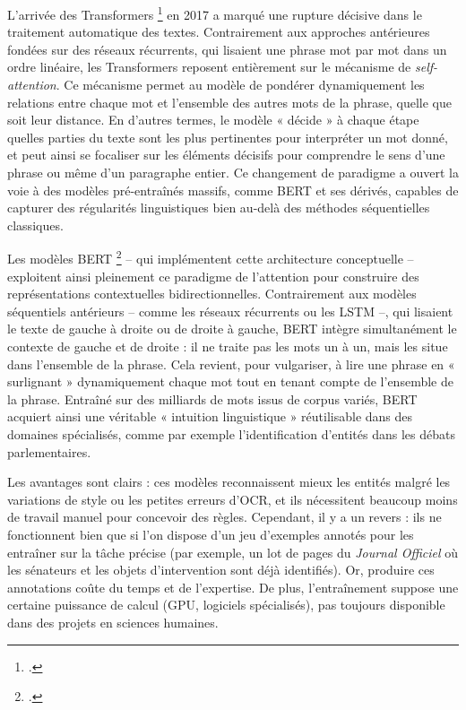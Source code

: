 L’arrivée des Transformers \footcite[][]{vaswani} en 2017 a marqué une rupture décisive dans le traitement automatique des textes. Contrairement aux approches antérieures fondées sur des réseaux récurrents, qui lisaient une phrase mot par mot dans un ordre linéaire, les Transformers reposent entièrement sur le mécanisme de \emph{self-attention}. Ce mécanisme permet au modèle de pondérer dynamiquement les relations entre chaque mot et l’ensemble des autres mots de la phrase, quelle que soit leur distance. En d’autres termes, le modèle « décide » à chaque étape quelles parties du texte sont les plus pertinentes pour interpréter un mot donné, et peut ainsi se focaliser sur les éléments décisifs pour comprendre le sens d’une phrase ou même d’un paragraphe entier. Ce changement de paradigme a ouvert la voie à des modèles pré-entraînés massifs, comme BERT et ses dérivés, capables de capturer des régularités linguistiques bien au-delà des méthodes séquentielles classiques.

Les modèles BERT \footcite[][]{devlin} -- qui implémentent cette architecture conceptuelle -- exploitent ainsi pleinement ce paradigme de l'attention pour construire des représentations contextuelles bidirectionnelles. Contrairement aux modèles séquentiels antérieurs -- comme les réseaux récurrents ou les LSTM --, qui lisaient le texte de gauche à droite ou de droite à gauche, BERT intègre simultanément le contexte de gauche et de droite : il ne traite pas les mots un à un, mais les situe dans l’ensemble de la phrase. Cela revient, pour vulgariser, à lire une phrase en « surlignant » dynamiquement chaque mot tout en tenant compte de l’ensemble de la phrase. Entraîné sur des milliards de mots issus de corpus variés, BERT acquiert ainsi une véritable « intuition linguistique » réutilisable dans des domaines spécialisés, comme par exemple l’identification d’entités dans les débats parlementaires.

Les avantages sont clairs : ces modèles reconnaissent mieux les entités malgré les variations de style ou les petites erreurs d’OCR, et ils nécessitent beaucoup moins de travail manuel pour concevoir des règles. Cependant, il y a un revers : ils ne fonctionnent bien que si l’on dispose d’un jeu d’exemples annotés pour les entraîner sur la tâche précise (par exemple, un lot de pages du \emph{Journal Officiel} où les sénateurs et les objets d’intervention sont déjà identifiés). Or, produire ces annotations coûte du temps et de l’expertise. De plus, l’entraînement suppose une certaine puissance de calcul (GPU, logiciels spécialisés), pas toujours disponible dans des projets en sciences humaines.

